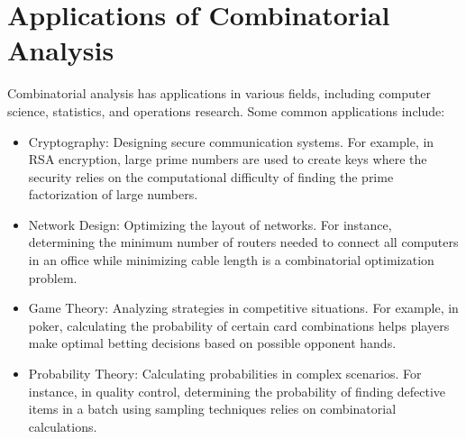 \section{Applications of Combinatorial Analysis}
Combinatorial analysis has applications in various fields, including computer science, statistics, and operations research. Some common applications include:
\begin{itemize}
    \item Cryptography: Designing secure communication systems. For example, in RSA encryption, large prime numbers are used to create keys where the security relies on the computational difficulty of finding the prime factorization of large numbers.
    
    \item Network Design: Optimizing the layout of networks. For instance, determining the minimum number of routers needed to connect all computers in an office while minimizing cable length is a combinatorial optimization problem.
    
    \item Game Theory: Analyzing strategies in competitive situations. For example, in poker, calculating the probability of certain card combinations helps players make optimal betting decisions based on possible opponent hands.
    
    \item Probability Theory: Calculating probabilities in complex scenarios. For instance, in quality control, determining the probability of finding defective items in a batch using sampling techniques relies on combinatorial calculations.
\end{itemize}
